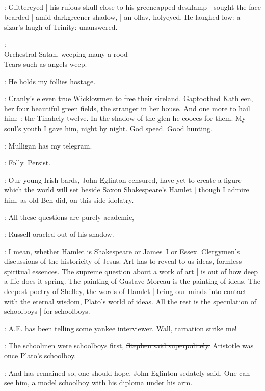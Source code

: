 :
Glittereyed |
his rufous skull close to his greencapped desklamp |
sought the face bearded |
amid darkgreener shadow, |
an ollav, holyeyed.
He laughed low:
a sizar's laugh of Trinity:
unanswered.

\StephenInt: \\
    Orchestral Satan, weeping many a rood \\
    Tears such as angels weep. \\

\StephenInt:
He holds my follies hostage.

\StephenInt:
Cranly's eleven true Wicklowmen to free their sireland.
Gaptoothed Kathleen,
her four beautiful green fields,
the stranger in her house.
And one more to hail him:
:
the Tinahely twelve.
In the shadow of the glen
he cooees for them.
My soul's youth I gave him, night by night.
God speed.
Good hunting.%

\StephenInt:
Mulligan has my telegram.

\StephenInt:
Folly. Persist.

\eglinton:
Our young Irish bards,
\sout{John Eglinton censured,}
have yet to create a figure
which the world will set beside Saxon Shakespeare's Hamlet |
though I admire him,
as old Ben did,
on this side idolatry.

\AErussell:
All these questions are purely academic,

:
Russell oracled out of his shadow.

\AErussell:
I mean, whether Hamlet is Shakespeare or James~I or Essex.
Clergymen's discussions of the historicity of Jesus.
Art has to reveal to us ideas,
formless spiritual essences.
The supreme question about a work of art |
is out of how deep a life does it spring.
The painting of Gustave Moreau is the painting of ideas.
The deepest poetry of Shelley,
the words of Hamlet |
bring our minds into contact with the eternal wisdom,
Plato's world of ideas.
All the rest is the speculation of schoolboys |
for schoolboys.

\StephenInt:
A.E. has been telling some yankee interviewer.
Wall, tarnation strike me!

\Stephen:
The schoolmen were schoolboys first,
\sout{Stephen said superpolitely.}
Aristotle was once Plato's schoolboy.

\eglinton:
And has remained so,
one should hope,
\sout{John Eglinton sedately said.}
One can see him,
a model schoolboy with his diploma under his arm.

